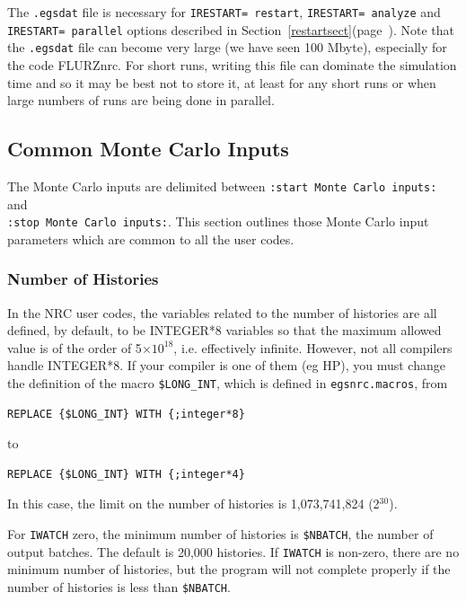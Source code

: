 \documentclass[12pt,twoside]{article}  %
\newcommand{\lpage}[1]{(page~\pageref{#1})}
\begin{document}
The {\tt .egsdat} file is necessary for {\tt IRESTART= restart},
{\tt IRESTART= analyze} and {\tt IRESTART= parallel} options described in
Section~\ref{restartsect}\lpage{restartsect}.  Note that the {\tt .egsdat}
file can become very large (we have seen 100 Mbyte), especially for
the code FLURZnrc.  For short runs, writing this file can dominate the
simulation time and so it may be best not to store it, at least for any
short runs or when large numbers of runs are being done in parallel.

\subsection{Common Monte Carlo Inputs}
\label{MC_inputs}

The Monte Carlo inputs are delimited between
\verb+:start Monte Carlo inputs:+ and \\
\verb+:stop Monte Carlo inputs:+. This section outlines those
Monte Carlo input parameters which are common to all the user codes.

\subsubsection{Number of Histories}
\label{histsect}

In the NRC user codes, the variables related to the number of histories
are all defined, by default, to be INTEGER*8 variables so that the
maximum allowed value is of the order of 5$\times 10^{18}$, i.e.
effectively infinite.  However, not all compilers handle INTEGER*8. If
your compiler is one of them (eg HP), you must change the definition of
the macro {\tt \$LONG\_INT}, which is defined in {\tt egsnrc.macros}, from
\begin{verbatim}
REPLACE {$LONG_INT} WITH {;integer*8}
\end{verbatim}
to
\begin{verbatim}
REPLACE {$LONG_INT} WITH {;integer*4}
\end{verbatim}
In this case, the limit on the number of histories is 1,073,741,824
(2$^{30}$).

For {\tt IWATCH} zero, the minimum number of histories is {\tt \$NBATCH},
the number of output batches.
The default is 20,000 histories.
If {\tt IWATCH} is non-zero, there are no minimum number of histories,
but the program will not complete properly if the number of histories
is less than {\tt \$NBATCH}.
\end{document}

